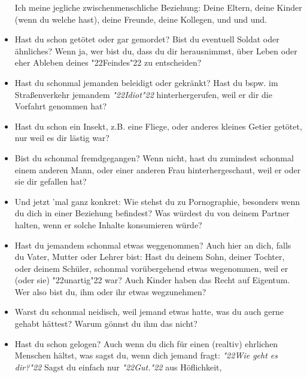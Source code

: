\documentclass[12pt,a5paper]{article}
\newcommand{\q}[1]{\char"22{#1}\char"22 }
\newcommand{\qq}[1]{\textit{\q{#1}}}
\begin{document}
\begin{itemize}[nosep]
					Ich meine jegliche zwischenmenschliche Beziehung:
					Deine Eltern,
					deine Kinder (wenn du welche hast),
					deine Freunde,
					deine Kollegen,
					und und und.
					\\
			\item	Hast du schon get\"otet oder gar gemordet?
					Bist du eventuell Soldat oder \"ahnliches?
					Wenn ja,
					wer bist du,
					dass du dir herausnimmst,
					\"uber Leben oder eher Ableben deines \q{Feindes} zu entscheiden?
					\\
			\item	Hast du schonmal jemanden beleidigt oder gekr\"ankt?
					Hast du bspw. im Stra{\ss}enverkehr jemandem \qq{Idiot} hinterhergerufen,
					weil er dir die Vorfahrt genommen hat?
					\\
			\item	Hast du schon ein Insekt,
					z.B. eine Fliege,
					oder anderes kleines Getier get\"otet,
					nur weil es dir l\"astig war?
					\\
			\item	Bist du schonmal fremdgegangen?
					Wenn nicht,
					hast du zumindest schonmal einem anderen Mann,
					oder einer anderen Frau hinterhergeschaut,
					weil er oder sie dir gefallen hat?
					\\
			\item	Und jetzt 'mal ganz konkret:
					Wie stehst du zu Pornographie,
					besonders wenn du dich in einer Beziehung befindest?
					Was w\"urdest du von deinem Partner halten,
					wenn er solche Inhalte konsumieren w\"urde?
					\\
			\item	Hast du jemandem schonmal etwas weggenommen?
					Auch hier an dich, falls du Vater,
					Mutter oder Lehrer bist:
					Hast du deinem Sohn,
					deiner Tochter,
					oder deinem Sch\"uler,
					schonmal vor\"ubergehend etwas wegenommen,
					weil er (oder sie) \q{unartig} war?
					Auch Kinder haben das Recht auf Eigentum.
					Wer also bist du,
					ihm oder ihr etwas wegzunehmen?
					\\
			\item	Warst du schonmal neidisch,
					weil jemand etwas hatte,
					was du auch gerne gehabt h\"attest?
					Warum g\"onnst du ihm das nicht?
					\\
			\item	Hast du schon gelogen?
					Auch wenn du dich f\"ur einen (realtiv) ehrlichen Menschen h\"altst,
					was sagst du,
					wenn dich jemand fragt:
					\qq{Wie geht es dir?}
					Sagst du einfach nur \qq{Gut.} aus H\"oflichkeit,

\end{itemize}
\end{document}
